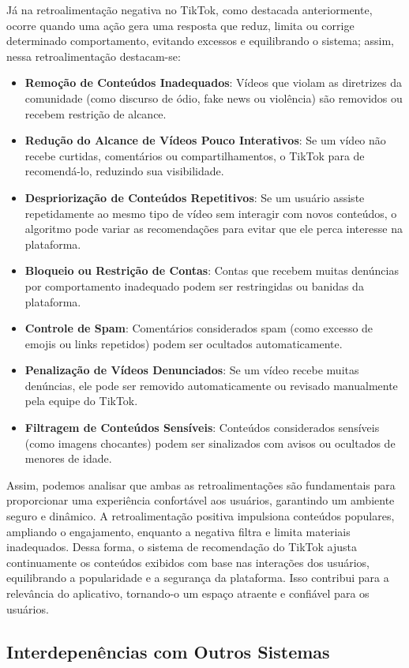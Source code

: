Já na retroalimentação negativa no TikTok, como destacada anteriormente, ocorre quando uma ação gera uma resposta que reduz, limita ou corrige determinado comportamento, evitando excessos e equilibrando o sistema; assim, nessa retroalimentação destacam-se:

\begin{itemize}
\item \textbf{Remoção de Conteúdos Inadequados}:
Vídeos que violam as diretrizes da comunidade (como discurso de ódio, fake news ou violência) são removidos ou recebem restrição de alcance.

\item \textbf{Redução do Alcance de Vídeos Pouco Interativos}:
Se um vídeo não recebe curtidas, comentários ou compartilhamentos, o TikTok para de recomendá-lo, reduzindo sua visibilidade.

\item \textbf{Despriorização de Conteúdos Repetitivos}:
Se um usuário assiste repetidamente ao mesmo tipo de vídeo sem interagir com novos conteúdos, o algoritmo pode variar as recomendações para evitar que ele perca interesse na plataforma.

\item \textbf{Bloqueio ou Restrição de Contas}:
Contas que recebem muitas denúncias por comportamento inadequado podem ser restringidas ou banidas da plataforma.

\item \textbf{Controle de Spam}: 
Comentários considerados spam (como excesso de emojis ou links repetidos) podem ser ocultados automaticamente.

\item \textbf{Penalização de Vídeos Denunciados}:
Se um vídeo recebe muitas denúncias, ele pode ser removido automaticamente ou revisado manualmente pela equipe do TikTok.

\item \textbf{Filtragem de Conteúdos Sensíveis}:
Conteúdos considerados sensíveis (como imagens chocantes) podem ser sinalizados com avisos ou ocultados de menores de idade.
\end{itemize}



Assim, podemos analisar que ambas as retroalimentações são fundamentais para proporcionar uma experiência confortável aos usuários, garantindo um ambiente seguro e dinâmico. A retroalimentação positiva impulsiona conteúdos populares, ampliando o engajamento, enquanto a negativa filtra e limita materiais inadequados. Dessa forma, o sistema de recomendação do TikTok ajusta continuamente os conteúdos exibidos com base nas interações dos usuários, equilibrando a popularidade e a segurança da plataforma. Isso contribui para a relevância do aplicativo, tornando-o um espaço atraente e confiável para os usuários.




\subsection{Interdepenências com Outros Sistemas}